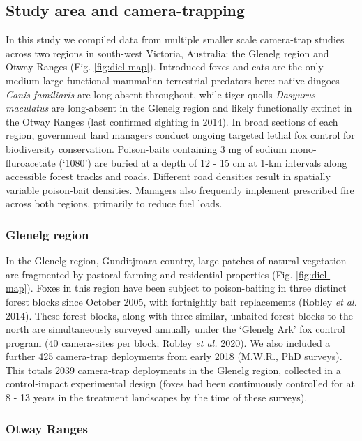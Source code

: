 \documentclass[11pt,a4paper,titlepage,twoside,openright]{style/unimelbthesis}
\begin{document}
\begin{mainmatter}
{\subsection{Study area and camera-trapping}\label{study-area-and-camera-trapping-1}}

In this study we compiled data from multiple smaller scale camera-trap studies across two regions in south-west Victoria, Australia: the Glenelg region and Otway Ranges (Fig. \ref{fig:diel-map}). Introduced foxes and cats are the only medium-large functional mammalian terrestrial predators here: native dingoes \emph{Canis familiaris} are long-absent throughout, while tiger quolls \emph{Dasyurus maculatus} are long-absent in the Glenelg region and likely functionally extinct in the Otway Ranges (last confirmed sighting in 2014). In broad sections of each region, government land managers conduct ongoing targeted lethal fox control for biodiversity conservation. Poison-baits containing 3 mg of sodium mono-fluroacetate (`1080') are buried at a depth of 12 - 15 cm at 1-km intervals along accessible forest tracks and roads. Different road densities result in spatially variable poison-bait densities. Managers also frequently implement prescribed fire across both regions, primarily to reduce fuel loads.

\hypertarget{glenelg-region-1}{%
\subsubsection{Glenelg region}\label{glenelg-region-1}}

In the Glenelg region, Gunditjmara country, large patches of natural vegetation are fragmented by pastoral farming and residential properties (Fig. \ref{fig:diel-map}). Foxes in this region have been subject to poison-baiting in three distinct forest blocks since October 2005, with fortnightly bait replacements (Robley \emph{et al.} 2014). These forest blocks, along with three similar, unbaited forest blocks to the north are simultaneously surveyed annually under the `Glenelg Ark' fox control program (40 camera-sites per block; Robley \emph{et al.} 2020). We also included a further 425 camera-trap deployments from early 2018 (M.W.R., PhD surveys). This totals 2039 camera-trap deployments in the Glenelg region, collected in a control-impact experimental design (foxes had been continuously controlled for at 8 - 13 years in the treatment landscapes by the time of these surveys).

\hypertarget{otway-ranges-1}{%
\subsubsection{Otway Ranges}\label{otway-ranges-1}}


\end{mainmatter}
\end{document}
